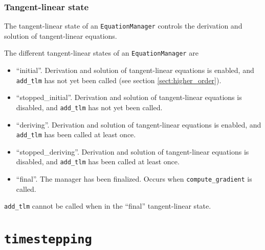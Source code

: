 \documentclass[11pt]{article}
\begin{document}
\subsubsection{Tangent-linear state}

The tangent-linear state of an \texttt{EquationManager} controls the derivation
and solution of tangent-linear equations.

The different tangent-linear states of an \texttt{EquationManager} are
\begin{itemize}
  \item ``initial''. Derivation and solution of tangent-linear equations is
    enabled, and \texttt{add\_tlm} has not yet been called (see section
    \ref{sect:higher_order}).
  \item ``stopped\_initial''. Derivation and solution of tangent-linear
    equations is disabled, and  \texttt{add\_tlm} has not yet been called.
  \item ``deriving''. Derivation and solution of tangent-linear equations is
    enabled, and \texttt{add\_tlm} has been called at least once.
  \item ``stopped\_deriving''. Derivation and solution of tangent-linear
    equations is disabled, and \texttt{add\_tlm} has been called at least once.
  \item ``final''. The manager has been finalized. Occurs when
    \texttt{compute\_gradient} is called.
\end{itemize}
\texttt{add\_tlm} cannot be called when in the ``final'' tangent-linear state.

\section{\texttt{timestepping}}
\end{document}

